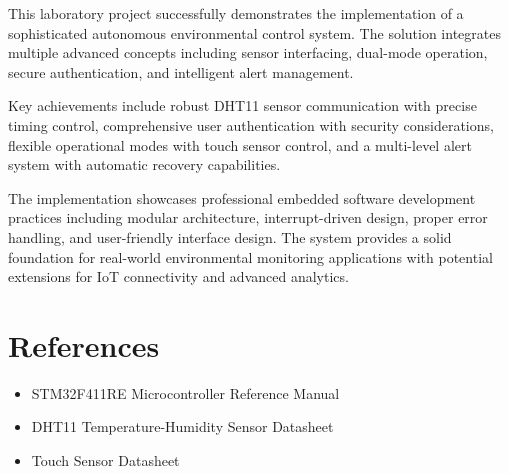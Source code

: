 \documentclass[12pt,a4paper]{article}
\begin{document}
\begin{tcolorbox}[mybox]
This laboratory project successfully demonstrates the implementation of a sophisticated autonomous environmental control system. The solution integrates multiple advanced concepts including sensor interfacing, dual-mode operation, secure authentication, and intelligent alert management.

Key achievements include robust DHT11 sensor communication with precise timing control, comprehensive user authentication with security considerations, flexible operational modes with touch sensor control, and a multi-level alert system with automatic recovery capabilities.

The implementation showcases professional embedded software development practices including modular architecture, interrupt-driven design, proper error handling, and user-friendly interface design. The system provides a solid foundation for real-world environmental monitoring applications with potential extensions for IoT connectivity and advanced analytics.

\end{tcolorbox}

\section*{References}
\begin{itemize}[label=\textcolor{myblue}{$\triangleright$}]
    \item STM32F411RE Microcontroller Reference Manual
    \item DHT11 Temperature-Humidity Sensor Datasheet
    \item Touch Sensor Datasheet

\end{itemize}
\end{document}
